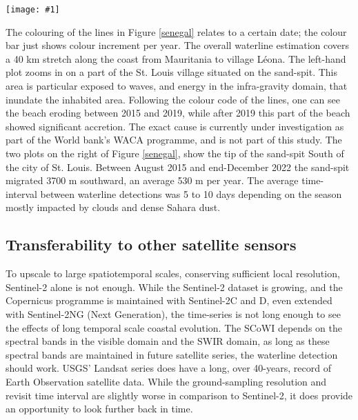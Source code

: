 \documentclass[remotesensing,article,submit,pdftex,moreauthors]{Definitions/mdpi}
\newcommand{\myfigure}[4]{
    \begin{figure*}[ht!]
        \centering
        \texttt{[image: \#1]}	 
        \caption{\itshape#2}
        \label{#3}
    \end{figure*} 
}
\begin{document}
\myfigure{img/senegal_stLouis_thinLines.png}{2015-2022 application at St. Louis, Senegal}{senegal}{1}

The colouring of the lines in Figure \ref{senegal} relates to a certain date; the colour bar just shows colour increment per year. The overall waterline estimation covers a 40 km stretch along the coast from Mauritania to village L\'{e}ona. The left-hand plot zooms in on a part of the St. Louis village situated on the sand-spit. This area is particular exposed to waves, and energy in the infra-gravity domain, that inundate the inhabited area. Following the colour code of the lines, one can see the beach eroding between 2015 and 2019, while after 2019 this part of the beach showed significant accretion. The exact cause is currently under investigation as part of the World bank's WACA programme, and is not part of this study. The two plots on the right of Figure \ref{senegal}, show the tip of the sand-spit South of the city of St. Louis. Between August 2015 and end-December 2022 the sand-spit migrated 3700 m southward, an average 530 m per year. The average time-interval between waterline detections was 5 to 10 days depending on the season mostly impacted by clouds and dense Sahara dust.
 
\subsection{Transferability to other satellite sensors}
To upscale to large spatiotemporal scales, conserving sufficient local resolution, Sentinel-2 alone is not enough. While the Sentinel-2 dataset is growing, and the Copernicus programme is maintained with Sentinel-2C and D, even extended with Sentinel-2NG (Next Generation), the time-series is not long enough to see the effects of long temporal scale coastal evolution. The SCoWI depends on the spectral bands in the visible domain and the SWIR domain, as long as these spectral bands are maintained in future satellite series, the waterline detection should work. USGS' Landsat series does have a long, over 40-years, record of Earth Observation satellite data. While the ground-sampling resolution and revisit time interval are slightly worse in comparison to Sentinel-2, it does provide an opportunity to look further back in time. 
\end{document}
